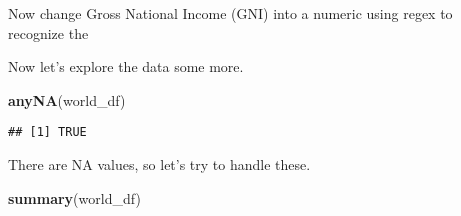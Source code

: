 \documentclass[]{article}
\newenvironment{Shaded}{\begin{snugshade}}{\end{snugshade}}
\newcommand{\KeywordTok}[1]{\textcolor[rgb]{0.13,0.29,0.53}{\textbf{#1}}}
\newcommand{\NormalTok}[1]{#1}
\newcommand{\OperatorTok}[1]{\textcolor[rgb]{0.81,0.36,0.00}{\textbf{#1}}}
\newcommand{\StringTok}[1]{\textcolor[rgb]{0.31,0.60,0.02}{#1}}
\begin{document}
Now change Gross National Income (GNI) into a numeric using regex to
recognize the

\begin{Shaded}
\end{Shaded}

Now let's explore the data some more.

\begin{Shaded}
\begin{Highlighting}[]
\KeywordTok{anyNA}\NormalTok{(world_df)}
\end{Highlighting}
\end{Shaded}

\begin{verbatim}
## [1] TRUE
\end{verbatim}

There are NA values, so let's try to handle these.

\begin{Shaded}
\begin{Highlighting}[]
\KeywordTok{summary}\NormalTok{(world_df)}
\end{Highlighting}
\end{Shaded}
\end{document}
